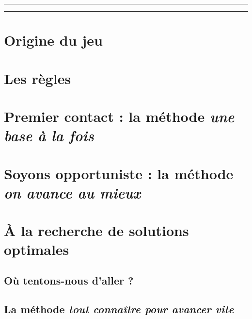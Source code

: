 \documentclass[a4,11pt]{article}
\begin{document}

\vspace{3cm}

\hrule

\tableofcontents

\vspace{4ex}

\hrule

\newpage



\section{Origine du jeu}    %
    


\section{Les règles}    %
    


\section{Premier contact : la méthode \textit{\og une base à la fois \fg}}    %
    


\section{Soyons opportuniste : la méthode \textit{\og on avance au mieux \fg}}    %
    


\section{À la recherche de solutions optimales}
	\subsection{Où tentons-nous d'aller ?}    %
    	

	\subsection{La méthode \textit{\og tout connaître pour avancer vite \fg}}
\end{document}
